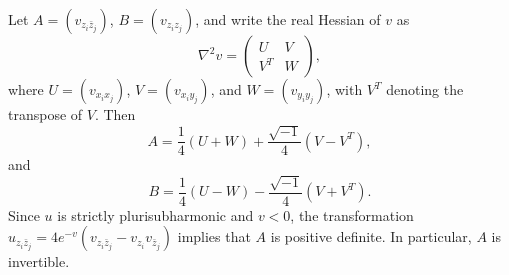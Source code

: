 \documentclass[11pt]{amsart}
\numberwithin{theorem}{section}
\numberwithin{equation}{section}
\begin{document}
Let $A=(v_{z_i\bar{z}_j})$, $B=(v_{z_iz_j})$, and write the real Hessian of $v$ as $$\nabla^2v=\begin{pmatrix}
U & V\\
V^T & W
\end{pmatrix},$$ where $U=(v_{x_ix_j})$, $V=(v_{x_iy_j})$, and $W=(v_{y_iy_j})$, with $V^T$ denoting the transpose of $V$. Then 
\begin{equation}\label{Matrix-A}
A=\frac{1}{4}(U+W)+\frac{\sqrt{-1}}{4}(V-V^T),
\end{equation} 
and 
\begin{equation}\label{Matrix-B}
B=\frac{1}{4}(U-W)-\frac{\sqrt{-1}}{4}(V+V^T).
\end{equation}
Since $u$ is strictly plurisubharmonic and $v<0$, the transformation $ u_{z_i\bar{z}_j}=4e^{-v}(v_{z_i\bar{z}_j}-v_{z_i}v_{\bar{z}_j})$ implies that $A$ is positive definite. In particular, $A$ is invertible.
 
\end{document}
